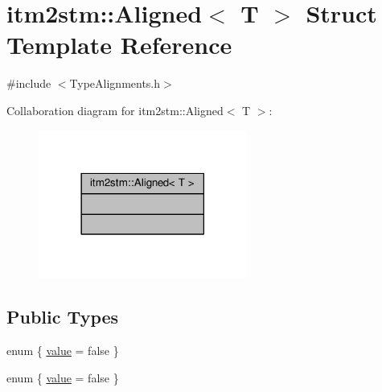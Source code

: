 \hypertarget{structitm2stm_1_1Aligned}{\section{itm2stm\-:\-:Aligned$<$ T $>$ Struct Template Reference}
\label{structitm2stm_1_1Aligned}
}


{\ttfamily \#include $<$Type\-Alignments.\-h$>$}



Collaboration diagram for itm2stm\-:\-:Aligned$<$ T $>$\-:
\nopagebreak
\begin{figure}[H]
\begin{center}
\leavevmode
\includegraphics[width=194pt]{structitm2stm_1_1Aligned__coll__graph}
\end{center}
\end{figure}
\subsection*{Public Types}
\begin{DoxyCompactItemize}
\item 
enum \{ \hyperlink{structitm2stm_1_1Aligned_af59843d96eb77039f855282ceaa5606da1d46bd7a44a703f34709d6032cd8afd8}{value} = false
 \}
\item 
enum \{ \hyperlink{structitm2stm_1_1Aligned_af59843d96eb77039f855282ceaa5606da1d46bd7a44a703f34709d6032cd8afd8}{value} = false
 \}
\end{DoxyCompactItemize}


